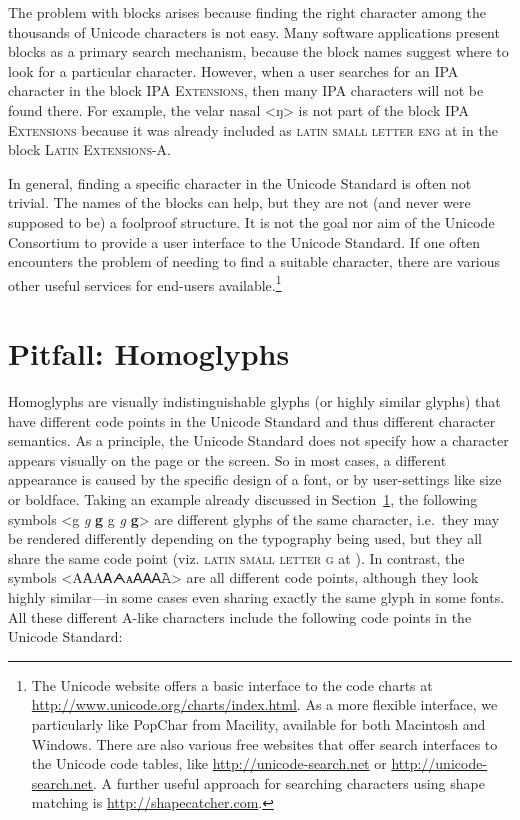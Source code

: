 The problem with blocks arises because finding the right character among the
thousands of Unicode characters is not easy. Many software applications present
blocks as a primary search mechanism, because the block names suggest where to
look for a particular character. However, when a user searches for an IPA
character in the block \textsc{IPA Extensions}, then many IPA characters will not
be found there. For example, the velar nasal <ŋ> is not part of the block
\textsc{IPA Extensions} because it was already included as \textsc{latin small letter
eng} at  in the block \textsc{Latin Extensions-A}.

In general, finding a specific character in the Unicode Standard is often not
trivial. The names of the blocks can help, but they are not (and never were supposed
to be) a foolproof structure. It is not the goal nor aim of the Unicode
Consortium to provide a user interface to the Unicode Standard. If one often
encounters the problem of needing to find a suitable character, there are
various other useful services for end-users available.\footnote{The Unicode
website offers a basic interface to the code charts at
\url{http://www.unicode.org/charts/index.html}. As a more flexible interface, we
particularly like PopChar from Macility, available for both Macintosh and
Windows. There are also various free websites that offer search interfaces
to the Unicode code tables, like \url{http://unicode-search.net} or
\url{http://unicode-search.net}. A further useful approach for searching characters
using shape matching is \url{http://shapecatcher.com}.}

\section{Pitfall: Homoglyphs}
\label{pitfall-homoglyphs}

Homoglyphs are visually indistinguishable glyphs (or highly similar glyphs) that
have different code points in the Unicode Standard and thus different character
semantics. As a principle, the Unicode Standard does not specify how a character
appears visually on the page or the screen. So in most cases, a different
appearance is caused by the specific design of a font, or by user-settings like
size or boldface. Taking an example already discussed in
Section~\ref{pitfall-homoglyphs}, the following symbols <g {\large \textit{g}}
\textbf{g} { {\small g} \textit{g} \textbf{g}}> are different
glyphs of the same character, i.e.~they may be rendered differently depending on
the typography being used, but they all share the same code point (viz.
\textsc{latin small letter g} at ). In contrast, the symbols
<{AАΑᎪᗅᴀꓮ𐊠𝖠𝙰}> are all different code points,
although they look highly similar---in some cases even sharing exactly the same
glyph in some fonts. All these different A-like characters include the following
code points in the Unicode Standard:


